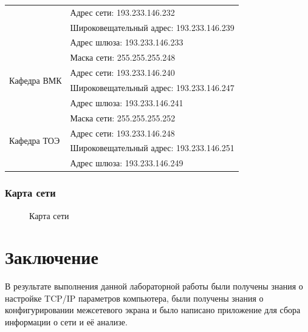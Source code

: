 \documentclass[a4paper]{article}
\begin{document}
\begin{center}
\begin{longtable}{|l|l|}
&Адрес сети: 193.233.146.232\\
&Широковещательный адрес: 193.233.146.239\\
&Адрес шлюза: 193.233.146.233\\
\hline
\multirow{4}{*}{Кафедра ВМК}&Маска сети: 255.255.255.248\\
&Адрес сети: 193.233.146.240\\
&Широковещательный адрес: 193.233.146.247\\
&Адрес шлюза: 193.233.146.241\\
\hline
\multirow{4}{*}{Кафедра ТОЭ}&Маска сети: 255.255.255.252\\
&Адрес сети: 193.233.146.248\\
&Широковещательный адрес: 193.233.146.251\\
&Адрес шлюза: 193.233.146.249\\
\hline
\end{longtable}
\end{center}

\subsubsection{Карта сети}

\begin{figure}[H]
\caption{Карта сети}
\end{figure}
\FloatBarrier

\section{Заключение}

В результате выполнения данной лабораторной работы были получены знания о настройке TCP/IP параметров компьютера, были получены знания о конфигурировании межсетевого экрана и было написано приложение для сбора информации о сети и её анализе.





		
\end{document}
